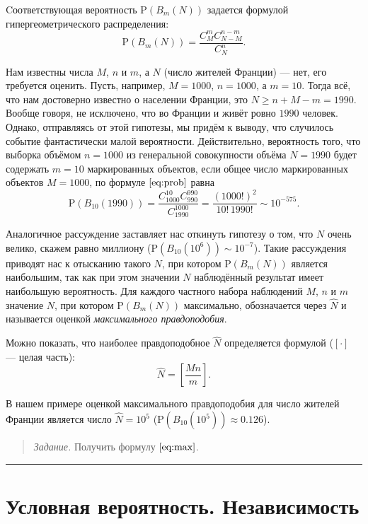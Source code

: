 \documentclass[11pt,a4paper]{article}
\renewcommand{\linethickness}{0.1ex}
\begin{document}
Cоответствующая вероятность \(\mathrm{P}(B_m(N))\) задается формулой
гипергеометрического распределения: \[
    \mathrm{P}(B_m(N)) = \frac{C_M^m C_{N-M}^{n-m}}{C_N^n}. \tag{1}\label{eq:prob}
\]

Нам известны числа \(M\), \(n\) и \(m\), а \(N\) (число жителей Франции)
--- нет, его требуется оценить. Пусть, например, \(M=1000\), \(n=1000\),
а \(m=10\). Тогда всё, что нам достоверно известно о населении Франции,
это \(N \ge n + M - m = 1990\). Вообще говоря, не исключено, что во
Франции и живёт ровно \(1990\) человек. Однако, отправляясь от этой
гипотезы, мы придём к выводу, что случилось событие фантастически малой
вероятности. Действительно, вероятность того, что выборка объёмом
\(n=1000\) из генеральной совокупности объёма \(N=1990\) будет содержать
\(m=10\) маркированных объектов, если общее число маркированных объектов
\(M=1000\), по формуле \(\eqref{eq:prob}\) равна \[
    \mathrm{P}(B_{10}(1990)) = \frac{C_{1000}^{10} C_{990}^{990}}{C_{1990}^{1000}} = \frac{(1000!)^2}{10! \, 1990!} \sim 10^{-575}.
\]

Аналогичное рассуждение заставляет нас откинуть гипотезу о том, что
\(N\) очень велико, скажем равно миллиону
(\(\mathrm{P}(B_{10}(10^6)) \sim 10^{-7}\)). Такие рассуждения приводят
нас к отысканию такого \(N\), при котором \(\mathrm{P}(B_m(N))\)
является наибольшим, так как при этом значении \(N\) наблюдённый
результат имеет наибольшую вероятность. Для каждого частного набора
наблюдений \(M\), \(n\) и \(m\) значение \(N\), при котором
\(\mathrm{P}(B_m(N))\) максимально, обозначается через \(\hat{N}\) и
называется оценкой \emph{максимального правдоподобия}.

Можно показать, что наиболее правдоподобное \(\hat{N}\) определяется
формулой (\([\cdot]\) --- целая часть):
\[ \hat{N} = \left[\dfrac{Mn}{m}\right]. \tag{2}\label{eq:max} \]

В нашем примере оценкой максимального правдоподобия для число жителей
Франции является число \(\hat{N} = 10^5\)
(\(\mathrm{P}(B_{10}(10^5)) \approx 0.126\)).

\begin{quote}
\emph{Задание.} Получить формулу \(\eqref{eq:max}\).
\end{quote}

    \begin{center}\rule{0.5\linewidth}{\linethickness}\end{center}

    \hypertarget{ux443ux441ux43bux43eux432ux43dux430ux44f-ux432ux435ux440ux43eux44fux442ux43dux43eux441ux442ux44c.-ux43dux435ux437ux430ux432ux438ux441ux438ux43cux43eux441ux442ux44c}{%
\section{Условная вероятность.
Независимость}\label{ux443ux441ux43bux43eux432ux43dux430ux44f-ux432ux435ux440ux43eux44fux442ux43dux43eux441ux442ux44c.-ux43dux435ux437ux430ux432ux438ux441ux438ux43cux43eux441ux442ux44c}}
\end{document}
